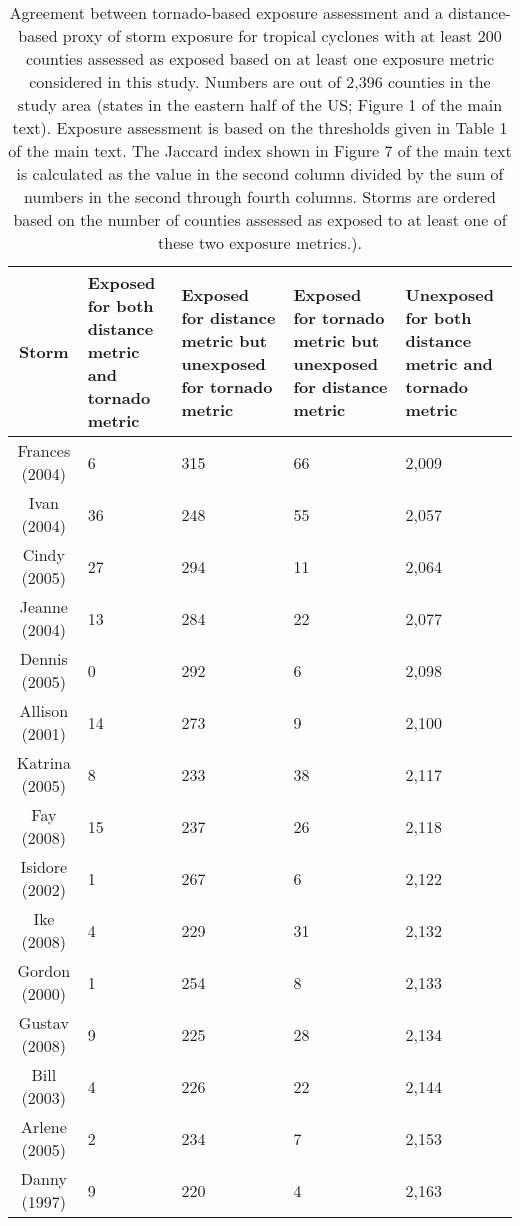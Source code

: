 \begin{table}[ht]
\centering
\caption{Agreement between tornado-based exposure assessment and a distance-based
         proxy of storm exposure for tropical cyclones with at least 200 counties assessed 
         as exposed based on at least one exposure metric considered in this study. Numbers 
         are out of 2,396 counties in the study area (states in the eastern half of the US; 
         Figure 1 of the main text). Exposure assessment is based on the thresholds given in 
         Table 1 of the main text. The Jaccard index shown in Figure 7 of the main text is 
         calculated as the value in the second column divided by the sum of numbers in the 
         second through fourth columns.  Storms are ordered based on the number of counties 
         assessed as exposed to at least one of these two exposure metrics.).} 
\label{tab:misclasstornado}
\begin{tabular}{cP{3cm}P{3cm}P{3cm}P{3cm}}
  \toprule
Storm & Exposed for both distance metric and tornado metric & Exposed for distance metric but unexposed for tornado metric & Exposed for tornado metric but unexposed for distance metric & Unexposed for both distance metric and tornado metric \\ 
  \midrule
Frances (2004) & 6 & 315 & 66 & 2,009 \\ 
  Ivan (2004) & 36 & 248 & 55 & 2,057 \\ 
  Cindy (2005) & 27 & 294 & 11 & 2,064 \\ 
  Jeanne (2004) & 13 & 284 & 22 & 2,077 \\ 
  Dennis (2005) & 0 & 292 & 6 & 2,098 \\ 
  Allison (2001) & 14 & 273 & 9 & 2,100 \\ 
  Katrina (2005) & 8 & 233 & 38 & 2,117 \\ 
  Fay (2008) & 15 & 237 & 26 & 2,118 \\ 
  Isidore (2002) & 1 & 267 & 6 & 2,122 \\ 
  Ike (2008) & 4 & 229 & 31 & 2,132 \\ 
  Gordon (2000) & 1 & 254 & 8 & 2,133 \\ 
  Gustav (2008) & 9 & 225 & 28 & 2,134 \\ 
  Bill (2003) & 4 & 226 & 22 & 2,144 \\ 
  Arlene (2005) & 2 & 234 & 7 & 2,153 \\ 
  Danny (1997) & 9 & 220 & 4 & 2,163 \\ 

\end{tabular}
\end{table}
